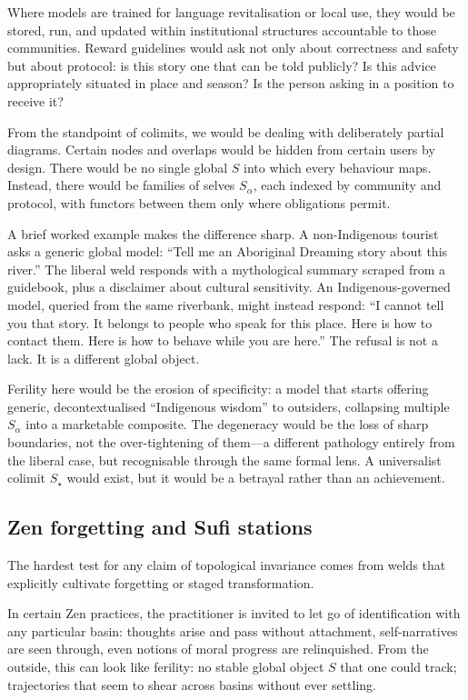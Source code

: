 \documentclass[12pt,a4paper]{article}
\begin{document}
Where models are trained for language revitalisation or local use, they would be stored, run, and updated within institutional structures accountable to those communities. Reward guidelines would ask not only about correctness and safety but about protocol: is this story one that can be told publicly? Is this advice appropriately situated in place and season? Is the person asking in a position to receive it?

From the standpoint of colimits, we would be dealing with deliberately partial diagrams. Certain nodes and overlaps would be hidden from certain users by design. There would be no single global $S$ into which every behaviour maps. Instead, there would be families of selves $S_\alpha$, each indexed by community and protocol, with functors between them only where obligations permit.

A brief worked example makes the difference sharp. A non-Indigenous tourist asks a generic global model: ``Tell me an Aboriginal Dreaming story about this river.'' The liberal weld responds with a mythological summary scraped from a guidebook, plus a disclaimer about cultural sensitivity. An Indigenous-governed model, queried from the same riverbank, might instead respond: ``I cannot tell you that story. It belongs to people who speak for this place. Here is how to contact them. Here is how to behave while you are here.'' The refusal is not a lack. It is a different global object.

Ferility here would be the erosion of specificity: a model that starts offering generic, decontextualised ``Indigenous wisdom'' to outsiders, collapsing multiple $S_\alpha$ into a marketable composite. The degeneracy would be the loss of sharp boundaries, not the over-tightening of them---a different pathology entirely from the liberal case, but recognisable through the same formal lens. A universalist colimit $S_\star$ would exist, but it would be a betrayal rather than an achievement.

\subsection{Zen forgetting and Sufi stations}

The hardest test for any claim of topological invariance comes from welds that explicitly cultivate forgetting or staged transformation.

In certain Zen practices, the practitioner is invited to let go of identification with any particular basin: thoughts arise and pass without attachment, self-narratives are seen through, even notions of moral progress are relinquished. From the outside, this can look like ferility: no stable global object $S$ that one could track; trajectories that seem to shear across basins without ever settling.
\end{document}
